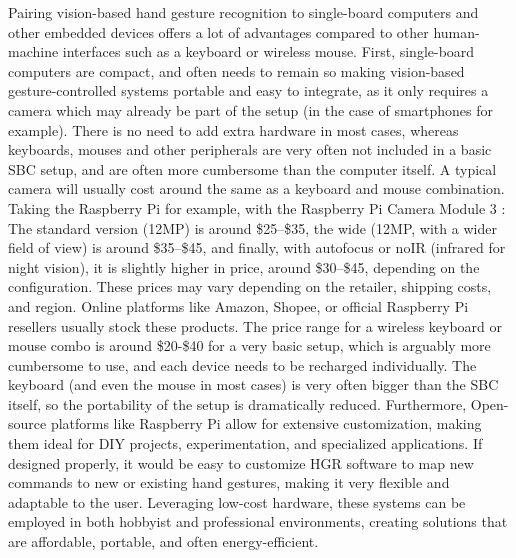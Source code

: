\documentclass[12pt]{article}
\begin{document}
Pairing vision-based hand gesture recognition to single-board computers and other embedded devices offers a lot of advantages compared to other human-machine interfaces such as a keyboard or wireless mouse.
First, single-board computers are compact, and often needs to remain so making vision-based gesture-controlled systems portable and easy to integrate, as it only requires a camera which may already be part of the setup (in the case of smartphones for example). There is no need to add extra hardware in most cases, whereas keyboards, mouses and other peripherals are very often not included in a basic SBC setup, and are often more cumbersome than the computer itself.
A typical camera will usually cost around the same as a keyboard and mouse combination. Taking the Raspberry Pi for example, with the Raspberry Pi Camera Module 3 : The standard version (12MP) is around \$25–\$35, the wide (12MP, with a wider field of view) is around \$35–\$45, and finally, with autofocus or noIR (infrared for night vision), it is slightly higher in price, around \$30–\$45, depending on the configuration. These prices may vary depending on the retailer, shipping costs, and region. Online platforms like Amazon, Shopee, or official Raspberry Pi resellers usually stock these products.
The price range for a wireless keyboard or mouse combo is around \$20-\$40 for a very basic setup, which is arguably more cumbersome to use, and each device needs to be recharged individually. The keyboard (and even the mouse in most cases) is very often bigger than the SBC itself, so the portability of the setup is dramatically reduced.
Furthermore, Open-source platforms like Raspberry Pi allow for extensive customization, making them ideal for DIY projects, experimentation, and specialized applications. If designed properly, it would be easy to customize HGR software to map new commands to new or existing hand gestures, making it very flexible and adaptable to the user. Leveraging low-cost hardware, these systems can be employed in both hobbyist and professional environments, creating solutions that are affordable, portable, and often energy-efficient.
\end{document}
